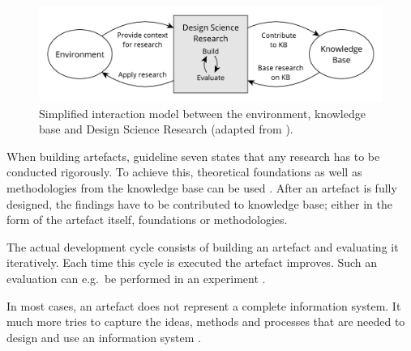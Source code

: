 \begin{figure}[H]
\begin{center}
  \includegraphics[scale=0.7]{images/figures/design_science_cycles.pdf}
\end{center}
\caption[Simplified interaction model between the environment, knowledge base and Design Science Research.]{Simplified interaction model between the environment, knowledge base and Design Science Research (adapted from \autocite[p. 88]{HevnerThreeCycleView2007}).}
\label{fig:design_science_cycles}
\end{figure}

When building artefacts, guideline seven states that any research has to be
conducted rigorously. To achieve this, theoretical foundations as well as
methodologies from the knowledge base can be used \autocite[p.
88]{VonAlanDesignscienceinformation2004}. After an artefact is fully designed,
the findings have to be contributed to knowledge base; either in the form of
the artefact itself, foundations or methodologies.

The actual development cycle consists of building an artefact and evaluating it
iteratively. Each time this cycle is executed the artefact improves. Such an
evaluation can e.g.\ be performed in an experiment \autocite[p.
91]{HevnerThreeCycleView2007}.

In most cases, an artefact does not represent a complete information system. It
much more tries to capture the ideas, methods and processes that are needed to
design and use an information system \autocite[p.
83]{VonAlanDesignscienceinformation2004}.

